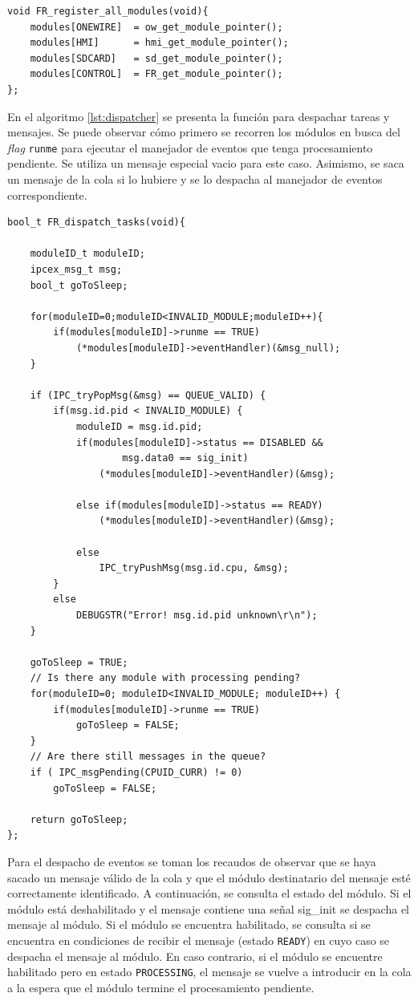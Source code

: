 \begin{lstlisting}[caption={Función para registrar los módulos del sistema.},label={lst:register}]
void FR_register_all_modules(void){
	modules[ONEWIRE]  = ow_get_module_pointer();
	modules[HMI]      = hmi_get_module_pointer();
	modules[SDCARD]   = sd_get_module_pointer();
	modules[CONTROL]  = FR_get_module_pointer();
};
\end{lstlisting}

En el algoritmo \ref{lst:dispatcher} se presenta la función para despachar tareas y mensajes.  Se puede observar cómo primero se recorren los módulos en busca del \textit{flag} \texttt{runme} para ejecutar el manejador de eventos que tenga procesamiento pendiente. Se utiliza un mensaje especial vacio para este caso. Asimismo, se saca un mensaje de la cola si lo hubiere y se lo despacha al manejador de eventos correspondiente.

\vspace{10px}
\begin{lstlisting}[caption={Función para despachar tareas y mensajes.},label={lst:dispatcher}]
bool_t FR_dispatch_tasks(void){

	moduleID_t moduleID;
	ipcex_msg_t msg;
	bool_t goToSleep;

	for(moduleID=0;moduleID<INVALID_MODULE;moduleID++){
		if(modules[moduleID]->runme == TRUE)
			(*modules[moduleID]->eventHandler)(&msg_null);
	}

	if (IPC_tryPopMsg(&msg) == QUEUE_VALID) {
		if(msg.id.pid < INVALID_MODULE) {
			moduleID = msg.id.pid;
			if(modules[moduleID]->status == DISABLED && 
					msg.data0 == sig_init)
				(*modules[moduleID]->eventHandler)(&msg);

			else if(modules[moduleID]->status == READY)
				(*modules[moduleID]->eventHandler)(&msg);

			else
				IPC_tryPushMsg(msg.id.cpu, &msg);
		}
		else 
			DEBUGSTR("Error! msg.id.pid unknown\r\n");
	}

	goToSleep = TRUE;
	// Is there any module with processing pending?
	for(moduleID=0; moduleID<INVALID_MODULE; moduleID++) {
		if(modules[moduleID]->runme == TRUE)
			goToSleep = FALSE;
	}
	// Are there still messages in the queue?
	if ( IPC_msgPending(CPUID_CURR) != 0)
		goToSleep = FALSE;

	return goToSleep;
};
\end{lstlisting}

Para el despacho de eventos se toman los recaudos de observar que se haya sacado un mensaje válido de la cola y que el módulo destinatario del mensaje esté correctamente identificado.  A continuación, se consulta el estado del módulo.  Si el módulo está deshabilitado y el mensaje contiene una señal sig\_init se despacha el mensaje al módulo. Si el módulo se encuentra habilitado, se consulta si se encuentra en condiciones de recibir el mensaje (estado \texttt{READY}) en cuyo caso se despacha el mensaje al módulo.  En caso contrario, si el módulo se encuentre habilitado pero en estado \texttt{PROCESSING}, el mensaje se vuelve a introducir en la cola a la espera que el módulo termine el procesamiento pendiente.

